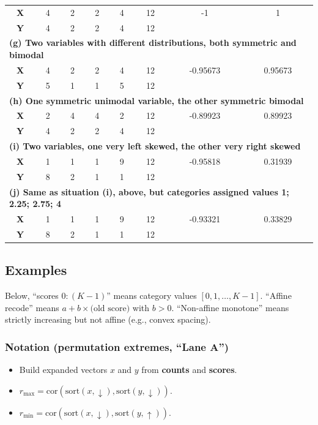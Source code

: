 \documentclass[
  12pt,
]{article}
\theoremstyle{plain}
\theoremstyle{definition}
\theoremstyle{remark}
\begin{document}
\begin{table}[H]
\begin{tabular}{c|cccc|c|cc}
\textbf{X} & 4 & 2 & 2 & 4 & 12 & -1 & 1 \\
\textbf{Y} & 4 & 2 & 2 & 4 & 12 & & \\
\hline
\multicolumn{8}{l}{\textbf{(g) Two variables with different distributions, both symmetric and bimodal}} \\
\textbf{X} & 4 & 2 & 2 & 4 & 12 & -0.95673 & 0.95673 \\
\textbf{Y} & 5 & 1 & 1 & 5 & 12 & & \\
\hline
\multicolumn{8}{l}{\textbf{(h) One symmetric unimodal variable, the other symmetric bimodal}} \\
\textbf{X} & 2 & 4 & 4 & 2 & 12 & -0.89923 & 0.89923 \\
\textbf{Y} & 4 & 2 & 2 & 4 & 12 & & \\
\hline
\multicolumn{8}{l}{\textbf{(i) Two variables, one very left skewed, the other very right skewed}} \\
\textbf{X} & 1 & 1 & 1 & 9 & 12 & -0.95818 & 0.31939 \\
\textbf{Y} & 8 & 2 & 1 & 1 & 12 & & \\
\hline
\multicolumn{8}{l}{\textbf{(j) Same as situation (i), above, but categories assigned values 1; 2.25; 2.75; 4}} \\
\textbf{X} & 1 & 1 & 1 & 9 & 12 & -0.93321 & 0.33829 \\
\textbf{Y} & 8 & 2 & 1 & 1 & 12 & & \\
\hline
\end{tabular}

\end{table}

\subsection{Examples}\label{examples}

Below, ``scores \(0{:}(K-1)\)'' means category values
\([0,1,\dots,K-1]\). ``Affine recode'' means
\(a+b\times\text{(old score)}\) with \(b>0\). ``Non-affine monotone''
means strictly increasing but not affine (e.g., convex spacing).

\subsubsection{Notation (permutation extremes, ``Lane
A'')}\label{notation-permutation-extremes-lane-a}

\begin{itemize}
\item
  Build expanded vectors \(x\) and \(y\) from \textbf{counts} and
  \textbf{scores}.
\item
  \(r_{\max}=\mathrm{cor}(\text{sort}(x,\downarrow),\text{sort}(y,\downarrow))\).
\item
  \(r_{\min}=\mathrm{cor}(\text{sort}(x,\downarrow),\text{sort}(y,\uparrow))\).
\end{itemize}
\end{document}

